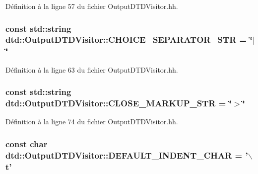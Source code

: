 Définition à la ligne 57 du fichier OutputDTDVisitor.hh.

\hypertarget{classdtd_1_1_output_d_t_d_visitor_a686bb62aed37769865a688fe50e55f0a}{
\subsubsection[{CHOICE\_\-SEPARATOR\_\-STR}]{\setlength{\rightskip}{0pt plus 5cm}const std::string {\bf dtd::OutputDTDVisitor::CHOICE\_\-SEPARATOR\_\-STR} = \char`\"{}$|$\char`\"{}}}
\label{classdtd_1_1_output_d_t_d_visitor_a686bb62aed37769865a688fe50e55f0a}


Définition à la ligne 63 du fichier OutputDTDVisitor.hh.

\hypertarget{classdtd_1_1_output_d_t_d_visitor_a4dbe0d3fda6b73977f28488cf2f9cff4}{
\subsubsection[{CLOSE\_\-MARKUP\_\-STR}]{\setlength{\rightskip}{0pt plus 5cm}const std::string {\bf dtd::OutputDTDVisitor::CLOSE\_\-MARKUP\_\-STR} = \char`\"{}$>$\char`\"{}}}
\label{classdtd_1_1_output_d_t_d_visitor_a4dbe0d3fda6b73977f28488cf2f9cff4}


Définition à la ligne 74 du fichier OutputDTDVisitor.hh.

\hypertarget{classdtd_1_1_output_d_t_d_visitor_af8b2c8e68ec262f98a21334900cb09df}{
\subsubsection[{DEFAULT\_\-INDENT\_\-CHAR}]{\setlength{\rightskip}{0pt plus 5cm}const char {\bf dtd::OutputDTDVisitor::DEFAULT\_\-INDENT\_\-CHAR} = '$\backslash$t'}}
\label{classdtd_1_1_output_d_t_d_visitor_af8b2c8e68ec262f98a21334900cb09df}


